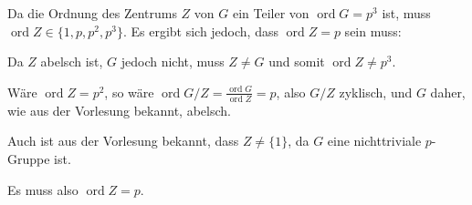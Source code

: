 \documentclass[a4paper,10pt]{article}
\theoremstyle{definition}
\newcommand{\ord}{\operatorname{ord}}
\begin{document}
\section{}
Da die Ordnung des Zentrums $Z$ von $G$ ein Teiler von $\ord G = p^3$ ist, muss $\ord Z \in \{1, p, p^2, p^3\}$. Es ergibt sich jedoch, dass $\ord Z = p$ sein muss:

Da $Z$ abelsch ist, $G$ jedoch nicht, muss $Z \neq G$ und somit $\ord Z \neq p^3$.

Wäre $\ord Z = p^2$, so wäre $\ord G/Z = \frac{\ord G}{\ord Z} = p$, also $G/Z$ zyklisch, und $G$ daher, wie aus der Vorlesung bekannt, abelsch.

Auch ist aus der Vorlesung bekannt, dass $Z \neq \{1\}$, da $G$ eine nichttriviale $p$-Gruppe ist.

Es muss also $\ord Z = p$.
\end{document}
